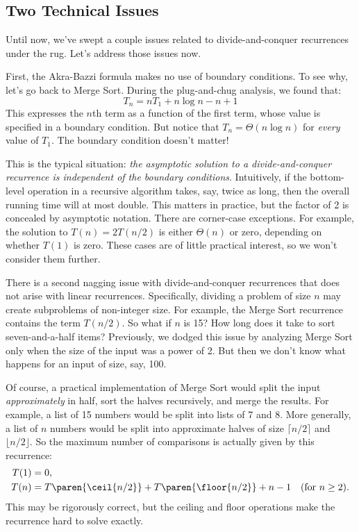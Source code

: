 \subsection{Two Technical Issues}

Until now, we've swept a couple issues related to divide-and-conquer
recurrences under the rug.  Let's address those issues now.

First, the Akra-Bazzi formula makes no use of boundary conditions.  To
see why, let's go back to Merge Sort.  During the plug-and-chug
analysis, we found that:
\[
T_n = n T_1 + n \log n - n + 1
\]
This expresses the $n$th term as a function of the first term, whose
value is specified in a boundary condition.  But notice that $T_n =
\Theta(n \log n)$ for \emph{every} value of $T_1$.  The boundary
condition doesn't matter!

This is the typical situation: \emph{the asymptotic solution to a
  divide-and-conquer recurrence is independent of the boundary
  conditions}.  Intuitively, if the bottom-level operation in a
recursive algorithm takes, say, twice as long, then the overall
running time will at most double.  This matters in practice, but the
factor of 2 is concealed by asymptotic notation.  There are
corner-case exceptions.  For example, the solution to $T(n) = 2
T(n/2)$ is either $\Theta(n)$ or zero, depending on whether $T(1)$ is
zero.  These cases are of little practical interest, so we won't
consider them further.

There is a second nagging issue with divide-and-conquer recurrences
that does not arise with linear recurrences.  Specifically, dividing
a problem of size $n$ may create subproblems of non-integer size.  For
example, the Merge Sort recurrence contains the term $T(n/2)$.  So
what if $n$ is 15?  How long does it take to sort seven-and-a-half
items?  Previously, we dodged this issue by analyzing Merge Sort only
when the size of the input was a power of 2.  But then we don't know
what happens for an input of size, say, 100.

Of course, a practical implementation of Merge Sort would split the
input \emph{approximately} in half, sort the halves recursively, and
merge the results.  For example, a list of 15 numbers would be split
into lists of 7 and 8.  More generally, a list of $n$ numbers would be
split into approximate halves of size $\lceil n / 2 \rceil$ and
$\lfloor n / 2 \rfloor$.  So the maximum number of comparisons is
actually given by this recurrence:
\begin{align*}
T(1) & = 0, \\
T(n) & = T\paren{\ceil{n/2}} + T\paren{\floor{n/2}}+ n - 1 & \text{(for $n \geq 2$).}
\end{align*}
This may be rigorously correct, but the ceiling and floor operations
make the recurrence hard to solve exactly.

